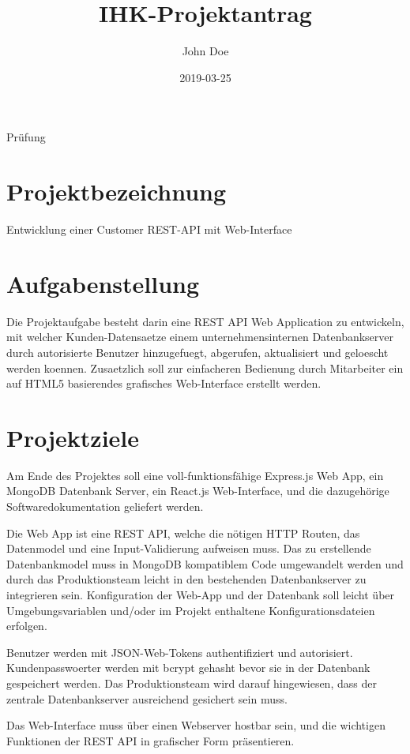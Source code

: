 \documentclass[11pt, a4paper]{article}
\title{IHK-Projektantrag}
\date{2019-03-25}
\author{John Doe}
\begin{document}
\maketitle
{}\newline
Pr{\"u}fung\quad {}\newline

\section{Projektbezeichnung}
Entwicklung einer Customer REST-API mit Web-Interface

\section{Aufgabenstellung}
Die Projektaufgabe besteht darin eine REST API Web Application zu entwickeln,
mit welcher Kunden-Datensaetze einem unternehmensinternen Datenbankserver durch
autorisierte Benutzer hinzugefuegt, abgerufen, aktualisiert und geloescht werden
koennen. Zusaetzlich soll zur einfacheren Bedienung durch Mitarbeiter ein auf
HTML5 basierendes grafisches Web-Interface erstellt werden.

\section{Projektziele}
Am Ende des Projektes soll eine voll-funktionsfähige Express.js Web App, ein
MongoDB Datenbank Server, ein React.js Web-Interface, und die dazugehörige
Softwaredokumentation geliefert werden.

Die Web App ist eine REST API, welche die nötigen HTTP Routen, das Datenmodel
und eine Input-Validierung aufweisen muss. Das zu erstellende Datenbankmodel
muss in MongoDB kompatiblem Code umgewandelt werden und durch das
Produktionsteam leicht in den bestehenden Datenbankserver zu integrieren sein.
Konfiguration der Web-App und der Datenbank soll leicht über Umgebungsvariablen
und/oder im Projekt enthaltene Konfigurationsdateien erfolgen.

Benutzer werden mit JSON-Web-Tokens authentifiziert und autorisiert.
Kundenpasswoerter werden mit bcrypt gehasht bevor sie in der Datenbank
gespeichert werden. Das Produktionsteam wird darauf hingewiesen, dass der
zentrale Datenbankserver ausreichend gesichert sein muss.

Das Web-Interface muss über einen Webserver hostbar sein, und die wichtigen
Funktionen der REST API in grafischer Form präsentieren.
\end{document}

